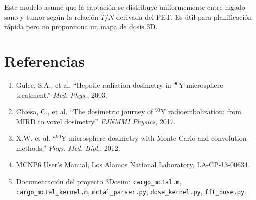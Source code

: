 \documentclass[12pt,a4paper]{article}
\begin{document}
Este modelo asume que la captación se distribuye uniformemente entre
hígado sano y tumor según la relación $T/N$ derivada del PET. Es útil
para planificación rápida pero no proporciona un mapa de dosis 3D.

\section{Referencias}

\begin{enumerate}
    \item Gulec, S.A., et al. ``Hepatic radiation dosimetry in
        $^{90}$Y-microsphere treatment.'' \textit{Med. Phys.}, 2003.
    \item Chiesa, C., et al. ``The dosimetric journey of $^{90}$Y
        radioembolization: from MIRD to voxel dosimetry.''
        \textit{EJNMMI Physics}, 2017.
    \item X.W. et al. ``$^{90}$Y microsphere dosimetry with Monte Carlo
        and convolution methods.'' \textit{Phys. Med. Biol.}, 2012.
    \item MCNP6 User's Manual, Los Alamos National Laboratory, LA-CP-13-00634.
    \item Documentación del proyecto 3Dosim:
        \texttt{cargo\_mctal.m}, \texttt{cargo\_mctal\_kernel.m},
        \texttt{mctal\_parser.py}, \texttt{dose\_kernel.py},
        \texttt{fft\_dose.py}.
\end{enumerate}
\end{document}
